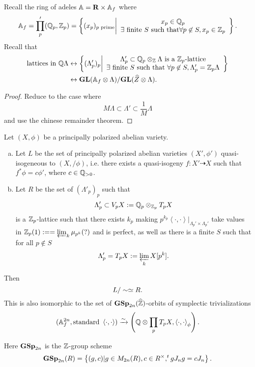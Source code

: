 Recall the ring of adeles $\mathbb{A} = \mathbf{R}\times \mathbb{A}_f$ where
\[
	\mathbb{A}_f = \prod_p'(\mathbb Q_p,\mathbb Z_p) = \left\{ (x_p)_{p\text{ prime}} \middle| \begin{array}{c}
		x_p\in \mathbb Q_p \\
		\exists \text{ finite }S\text{ such that}\forall p\not\in S,x_p\in \mathbb Z_p
	\end{array}\right\} .
\] 
Recall that
\begin{align*}
	\text{lattices in }\mathbb Q\Lambda &\leftrightarrow \left\{ (\Lambda'_p)_p \middle| \begin{array}{c}
		\Lambda'_p\subset \mathbb Q_p\otimes_\mathbb Z\Lambda\text{ is a }\mathbb Z_p\text{-lattice} \\
		\exists \text{ finite }S\text{ such that }\forall p\not\in S, \Lambda'_p = \mathbb Z_p\Lambda  
	\end{array}\right\} \\
				     &\leftrightarrow \mathbf{GL}(\mathbb{A}_f\otimes\Lambda) /\mathbf{GL}(\widehat{Z}\otimes \Lambda).
\end{align*}
\begin{proof}
	Reduce to the case where
	\[
	M\Lambda \subset \Lambda' \subset \frac{1}{M}\Lambda
	\] 
	and use the chinese remainder theorem.
\end{proof}
\begin{proposition}
	Let $(X,\phi)$ be a principally polarized abelian variety.
	\begin{enumerate}[(a)]
		\item Let $L$ be the set of principally polarized abelian varieties $(X',\phi')$ quasi-isogeneous to $(X, /\phi)$, i.e. there exists a quasi-isogeny $f:X'\dashrightarrow X$ such that $f^{*}\phi = c\phi'$, where $c\in \mathbb Q_{>0}$.
		\item Let $R$ be the set of $(\Lambda'_p)_p$ such that 
			\[
			\Lambda'_p \subset V_pX := \mathbb Q_p \otimes_{\mathbb Z_p}T_pX
			\] 
			is a $\mathbb Z_p$-lattice such that there exists $k_p$ making $p^{k_p}\left<\cdot ,\cdot  \right>|_{\Lambda_p'\times \Lambda_p'}$ take values in $\mathbb Z_p(1):= = \varprojlim_k \mu_{p^{k}}(?)$ and is perfect, as well as there is a finite $S$ such that for all $p\not\in S$
			\[
				\Lambda_p' = T_pX := \varprojlim_k X[p^{k}].
			\] 
	\end{enumerate}
	Then
	\[
	L /\sim \simeq R.
	\] 
	This is also isomorphic to the set of $\mathbf{GSp}_{2n}(\widehat{\mathbb Z})$-orbits of symplectic trivializations
	\[
		(\mathbb{A}_f^{2n},\text{standard }\left<\cdot ,\cdot  \right>) \xrightarrow{\sim} \left( \mathbb Q\otimes \prod_p T_p X, \left<\cdot ,\cdot  \right>_\phi \right) .
	\] 
\end{proposition}
Here $\mathbf{GSp}_{2n}$ is the $\mathbb Z$-group scheme
\[
\mathbf{GSp}_{2n}(R) = \left\{ (g,c) | g\in M_{2n}(R),c\in R^{\times }, ^{t}gJ_ng = cJ_n \right\} .
\] 

